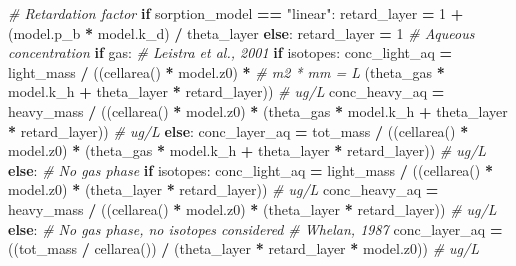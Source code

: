 \documentclass[]{article}
\newenvironment{Shaded}{\begin{snugshade}}{\end{snugshade}}
\newcommand{\DecValTok}[1]{\textcolor[rgb]{0.00,0.00,0.81}{{#1}}}
\newcommand{\StringTok}[1]{\textcolor[rgb]{0.31,0.60,0.02}{{#1}}}
\newcommand{\CommentTok}[1]{\textcolor[rgb]{0.56,0.35,0.01}{\textit{{#1}}}}
\newcommand{\ControlFlowTok}[1]{\textcolor[rgb]{0.13,0.29,0.53}{\textbf{{#1}}}}
\newcommand{\OperatorTok}[1]{\textcolor[rgb]{0.81,0.36,0.00}{\textbf{{#1}}}}
\newcommand{\NormalTok}[1]{{#1}}
\begin{document}
\begin{Shaded}
\begin{Highlighting}[]
    \CommentTok{# Retardation factor}
    \ControlFlowTok{if} \NormalTok{sorption_model }\OperatorTok{==} \StringTok{"linear"}\NormalTok{:}
        \NormalTok{retard_layer }\OperatorTok{=} \DecValTok{1} \OperatorTok{+} \NormalTok{(model.p_b }\OperatorTok{*} \NormalTok{model.k_d) }\OperatorTok{/} \NormalTok{theta_layer}
    \ControlFlowTok{else}\NormalTok{:}
        \NormalTok{retard_layer }\OperatorTok{=} \DecValTok{1}
    \CommentTok{# Aqueous concentration}
    \ControlFlowTok{if} \NormalTok{gas:}
        \CommentTok{# Leistra et al., 2001}
        \ControlFlowTok{if} \NormalTok{isotopes:}
            \NormalTok{conc_light_aq }\OperatorTok{=} \NormalTok{light_mass }\OperatorTok{/} \NormalTok{((cellarea() }\OperatorTok{*} \NormalTok{model.z0) }\OperatorTok{*}  \CommentTok{# m2 * mm = L}
                                          \NormalTok{(theta_gas }\OperatorTok{*} \NormalTok{model.k_h }\OperatorTok{+}
                                           \NormalTok{theta_layer }\OperatorTok{*} \NormalTok{retard_layer))  }\CommentTok{# ug/L}
            \NormalTok{conc_heavy_aq }\OperatorTok{=} \NormalTok{heavy_mass }\OperatorTok{/} \NormalTok{((cellarea() }\OperatorTok{*} \NormalTok{model.z0) }\OperatorTok{*}
                                          \NormalTok{(theta_gas }\OperatorTok{*} \NormalTok{model.k_h }\OperatorTok{+}
                                           \NormalTok{theta_layer }\OperatorTok{*} \NormalTok{retard_layer))  }\CommentTok{# ug/L}
        \ControlFlowTok{else}\NormalTok{:}
            \NormalTok{conc_layer_aq }\OperatorTok{=} \NormalTok{tot_mass }\OperatorTok{/} \NormalTok{((cellarea() }\OperatorTok{*} \NormalTok{model.z0) }\OperatorTok{*}
                                        \NormalTok{(theta_gas }\OperatorTok{*} \NormalTok{model.k_h }\OperatorTok{+}
                                         \NormalTok{theta_layer }\OperatorTok{*} \NormalTok{retard_layer))  }\CommentTok{# ug/L}
    \ControlFlowTok{else}\NormalTok{:  }\CommentTok{# No gas phase}
        \ControlFlowTok{if} \NormalTok{isotopes:}
            \NormalTok{conc_light_aq }\OperatorTok{=} \NormalTok{light_mass }\OperatorTok{/} \NormalTok{((cellarea() }\OperatorTok{*} \NormalTok{model.z0) }\OperatorTok{*}
                                          \NormalTok{(theta_layer }\OperatorTok{*} \NormalTok{retard_layer))  }\CommentTok{# ug/L}
            \NormalTok{conc_heavy_aq }\OperatorTok{=} \NormalTok{heavy_mass }\OperatorTok{/} \NormalTok{((cellarea() }\OperatorTok{*} \NormalTok{model.z0) }\OperatorTok{*}
                                          \NormalTok{(theta_layer }\OperatorTok{*} \NormalTok{retard_layer))  }\CommentTok{# ug/L}
        \ControlFlowTok{else}\NormalTok{:  }\CommentTok{# No gas phase, no isotopes considered}
            \CommentTok{# Whelan, 1987}
            \NormalTok{conc_layer_aq }\OperatorTok{=} \NormalTok{((tot_mass }\OperatorTok{/} \NormalTok{cellarea()) }\OperatorTok{/}
                             \NormalTok{(theta_layer }\OperatorTok{*} \NormalTok{retard_layer }\OperatorTok{*} \NormalTok{model.z0))  }\CommentTok{# ug/L}


\end{Highlighting}
\end{Shaded}
\end{document}
